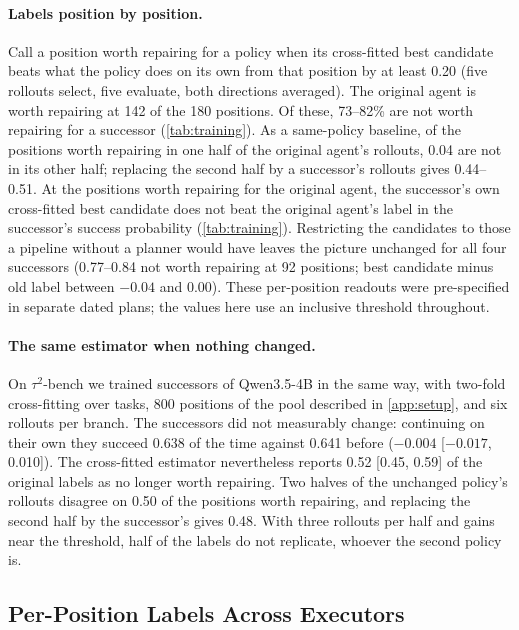 \documentclass{article}
\newcommand{\tautwo}{$\tau^2$-bench}
\theoremstyle{plain}
\theoremstyle{definition}
\theoremstyle{remark}
\begin{document}
\paragraph{Labels position by position.}
Call a position worth repairing for a policy when its cross-fitted best candidate beats what the policy does on its own from that position by at least 0.20 (five rollouts select, five evaluate, both directions averaged). The original agent is worth repairing at 142 of the 180 positions. Of these, 73--82\% are not worth repairing for a successor (\cref{tab:training}). As a same-policy baseline, of the positions worth repairing in one half of the original agent's rollouts, 0.04 are not in its other half; replacing the second half by a successor's rollouts gives 0.44--0.51. At the positions worth repairing for the original agent, the successor's own cross-fitted best candidate does not beat the original agent's label in the successor's success probability (\cref{tab:training}). Restricting the candidates to those a pipeline without a planner would have leaves the picture unchanged for all four successors (0.77--0.84 not worth repairing at 92 positions; best candidate minus old label between $-0.04$ and 0.00). These per-position readouts were pre-specified in separate dated plans; the values here use an inclusive threshold throughout.

\paragraph{The same estimator when nothing changed.}
On \tautwo{} we trained successors of Qwen3.5-4B in the same way, with two-fold cross-fitting over tasks, 800 positions of the pool described in \cref{app:setup}, and six rollouts per branch. The successors did not measurably change: continuing on their own they succeed 0.638 of the time against 0.641 before ($-0.004$ [$-0.017$, 0.010]). The cross-fitted estimator nevertheless reports 0.52 [0.45, 0.59] of the original labels as no longer worth repairing. Two halves of the unchanged policy's rollouts disagree on 0.50 of the positions worth repairing, and replacing the second half by the successor's gives 0.48. With three rollouts per half and gains near the threshold, half of the labels do not replicate, whoever the second policy is.

\subsection{Per-Position Labels Across Executors}
\label{app:labels}
\end{document}
